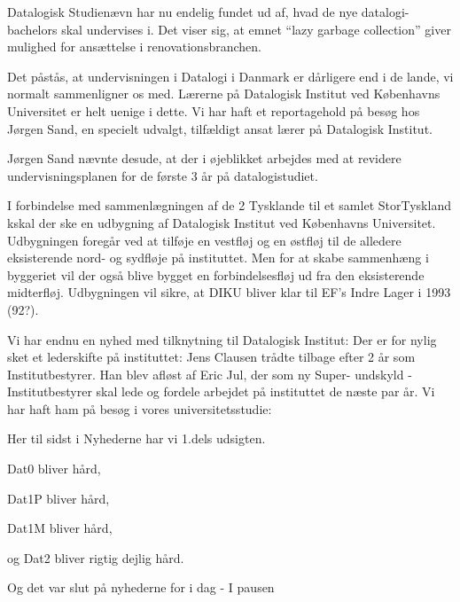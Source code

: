 \documentclass[a4paper,11pt]{article}
\begin{document}
\begin{sketch}

     Datalogisk Studienævn har nu endelig fundet ud af, hvad de nye datalogi-bachelors skal undervises i.
             Det viser sig, at emnet ``lazy garbage collection'' giver mulighed for ansættelse i renovationsbranchen.

     Det påstås, at undervisningen i Datalogi i Danmark er dårligere end i de lande, vi normalt sammenligner os med.
             Lærerne på Datalogisk Institut ved Københavns Universitet er helt uenige i dette.
             Vi har haft et reportagehold på besøg hos Jørgen Sand, en specielt udvalgt, tilfældigt ansat lærer på Datalogisk Institut.


     Jørgen Sand nævnte desude, at der i øjeblikket arbejdes med at revidere undervisningsplanen for de første 3 år på datalogistudiet.


     I forbindelse med sammenlægningen af de 2 Tysklande til et samlet StorTyskland kskal der ske en udbygning af Datalogisk Institut
             ved Københavns Universitet. Udbygningen foregår ved at tilføje en vestfløj og en østfløj til de alledere eksisterende
             nord- og sydfløje på instituttet. Men for at skabe sammenhæng i byggeriet vil der også blive bygget en forbindelsesfløj
             ud fra den eksisterende midterfløj. Udbygningen vil sikre, at DIKU bliver klar til EF's Indre Lager i 1993 (92?).

     Vi har endnu en nyhed med tilknytning til Datalogisk Institut: Der er for nylig sket et lederskifte på instituttet:
             Jens Clausen trådte tilbage efter 2 år som Institutbestyrer. Han blev afløst af Eric Jul, der som ny Super- undskyld -
             Institutbestyrer skal lede og fordele arbejdet på instituttet de næste par år. Vi har haft ham på besøg i vores universitetsstudie:



     Her til sidst i Nyhederne har vi 1.dels udsigten.

             Dat0 bliver hård,

             Dat1P bliver hård,

             Dat1M bliver hård,

             og Dat2 bliver rigtig dejlig hård.

             Og det var slut på nyhederne for i dag - I pausen 
\end{sketch}
\end{document}
